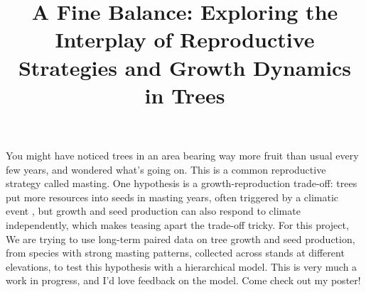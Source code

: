 \documentclass[11pt]{article}
\title{A Fine Balance: Exploring the Interplay of Reproductive Strategies and Growth Dynamics in Trees}
\date{}
\begin{document}
\maketitle
You might have noticed trees in an area bearing way more fruit than usual every few years, and wondered what's going on. This is a common reproductive strategy called masting. One hypothesis is a growth-reproduction trade-off: trees put more resources into seeds in masting years, often triggered by a climatic event , but growth and seed production can also respond to climate independently, which makes teasing apart the trade-off tricky. For this project, We are trying to use long-term paired data on tree growth and seed production, from species with strong masting patterns, collected across stands at different elevations, to test this hypothesis with a hierarchical model. This is very much a work in progress, and I'd love feedback on the model. Come check out my poster!
\end{document}
